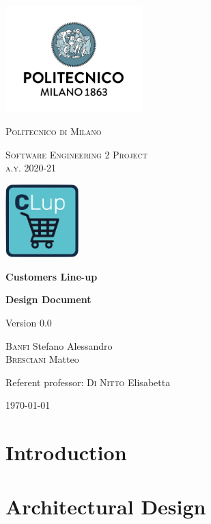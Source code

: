 \documentclass[fontsize=11pt,paper=a4,pagesize=auto]{report}
\begin{document}
\begin{titlepage}
	\centering
	\includegraphics[width=150pt]{images/polimi.jpg}\par\vspace{1cm}
	{\scshape\LARGE
		Politecnico di Milano\par}
	\vspace{0.2cm}
	{\scshape\Large
		Software Engineering 2 Project\\
		a.y. 2020-21\par}
			\vspace{0.5cm}
		\includegraphics[width=80pt]{images/CLup_logo.png}\par
	{\huge\bfseries
		Customers Line-up\\\par}

	{\Large\bfseries
		Design Document\par}
	Version 0.0\par
	\vspace{1cm}
	{\Large
		{\scshape Banfi}  Stefano Alessandro\\
		{\scshape Bresciani} Matteo\par}
	\vfill
	Referent professor: {\scshape Di Nitto} Elisabetta\par
	\vfill
	{\large\today\par}
\end{titlepage}



\tableofcontents

\chapter{Introduction}



\chapter{Architectural Design}

\end{document}
